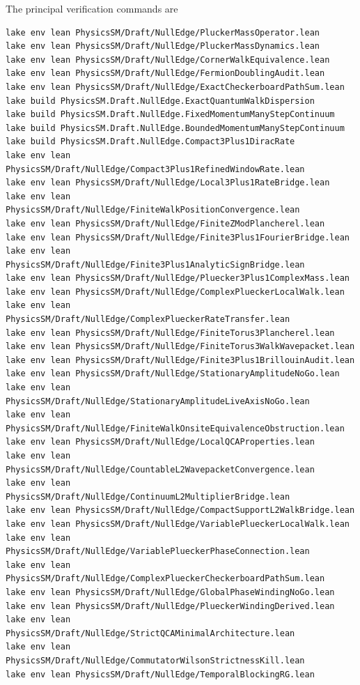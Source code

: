 \documentclass[11pt]{article}
\begin{document}
The principal verification commands are
\begin{verbatim}
lake env lean PhysicsSM/Draft/NullEdge/PluckerMassOperator.lean
lake env lean PhysicsSM/Draft/NullEdge/PluckerMassDynamics.lean
lake env lean PhysicsSM/Draft/NullEdge/CornerWalkEquivalence.lean
lake env lean PhysicsSM/Draft/NullEdge/FermionDoublingAudit.lean
lake env lean PhysicsSM/Draft/NullEdge/ExactCheckerboardPathSum.lean
lake build PhysicsSM.Draft.NullEdge.ExactQuantumWalkDispersion
lake build PhysicsSM.Draft.NullEdge.FixedMomentumManyStepContinuum
lake build PhysicsSM.Draft.NullEdge.BoundedMomentumManyStepContinuum
lake build PhysicsSM.Draft.NullEdge.Compact3Plus1DiracRate
lake env lean PhysicsSM/Draft/NullEdge/Compact3Plus1RefinedWindowRate.lean
lake env lean PhysicsSM/Draft/NullEdge/Local3Plus1RateBridge.lean
lake env lean PhysicsSM/Draft/NullEdge/FiniteWalkPositionConvergence.lean
lake env lean PhysicsSM/Draft/NullEdge/FiniteZModPlancherel.lean
lake env lean PhysicsSM/Draft/NullEdge/Finite3Plus1FourierBridge.lean
lake env lean PhysicsSM/Draft/NullEdge/Finite3Plus1AnalyticSignBridge.lean
lake env lean PhysicsSM/Draft/NullEdge/Pluecker3Plus1ComplexMass.lean
lake env lean PhysicsSM/Draft/NullEdge/ComplexPlueckerLocalWalk.lean
lake env lean PhysicsSM/Draft/NullEdge/ComplexPlueckerRateTransfer.lean
lake env lean PhysicsSM/Draft/NullEdge/FiniteTorus3Plancherel.lean
lake env lean PhysicsSM/Draft/NullEdge/FiniteTorus3WalkWavepacket.lean
lake env lean PhysicsSM/Draft/NullEdge/Finite3Plus1BrillouinAudit.lean
lake env lean PhysicsSM/Draft/NullEdge/StationaryAmplitudeNoGo.lean
lake env lean PhysicsSM/Draft/NullEdge/StationaryAmplitudeLiveAxisNoGo.lean
lake env lean PhysicsSM/Draft/NullEdge/FiniteWalkOnsiteEquivalenceObstruction.lean
lake env lean PhysicsSM/Draft/NullEdge/LocalQCAProperties.lean
lake env lean PhysicsSM/Draft/NullEdge/CountableL2WavepacketConvergence.lean
lake env lean PhysicsSM/Draft/NullEdge/ContinuumL2MultiplierBridge.lean
lake env lean PhysicsSM/Draft/NullEdge/CompactSupportL2WalkBridge.lean
lake env lean PhysicsSM/Draft/NullEdge/VariablePlueckerLocalWalk.lean
lake env lean PhysicsSM/Draft/NullEdge/VariablePlueckerPhaseConnection.lean
lake env lean PhysicsSM/Draft/NullEdge/ComplexPlueckerCheckerboardPathSum.lean
lake env lean PhysicsSM/Draft/NullEdge/GlobalPhaseWindingNoGo.lean
lake env lean PhysicsSM/Draft/NullEdge/PlueckerWindingDerived.lean
lake env lean PhysicsSM/Draft/NullEdge/StrictQCAMinimalArchitecture.lean
lake env lean PhysicsSM/Draft/NullEdge/CommutatorWilsonStrictnessKill.lean
lake env lean PhysicsSM/Draft/NullEdge/TemporalBlockingRG.lean

\end{verbatim}
\end{document}
